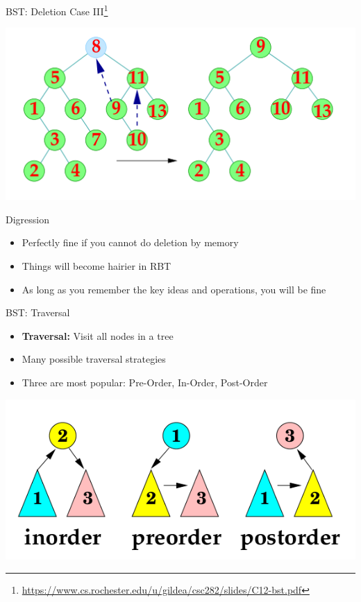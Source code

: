 \documentclass{beamer}
\newcommand{\furl}[1]{{\footnote{\url{#1}}}}
\begin{document}
\begin{frame}{BST: Deletion Case III\furl{https://www.cs.rochester.edu/u/gildea/csc282/slides/C12-bst.pdf}}
    \begin{center}
        \includegraphics[scale=0.6]{bstDelCase3.png}
    \end{center}
\end{frame}


\begin{frame}{Digression}
    \begin{itemize}
        \item Perfectly fine if you cannot do deletion by memory
        \item Things will become hairier in RBT
        \item As long as you remember the key ideas and operations, you will be fine
    \end{itemize}
\end{frame}


\begin{frame}{BST: Traversal}
    \begin{itemize}
        \item {\bf Traversal:} Visit all nodes in a tree
        \item Many possible traversal strategies
        \item Three are most popular:  Pre-Order, In-Order, Post-Order
    \end{itemize}
    \begin{center}
        \includegraphics[scale=0.5]{bstTraversals.png}
    \end{center}
\end{frame}
\end{document}
